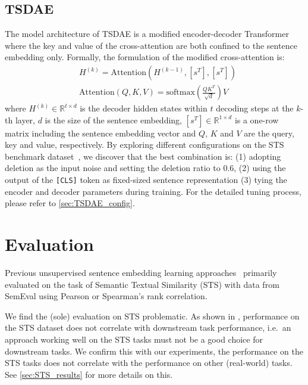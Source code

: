 \documentclass[11pt]{article}
\begin{document}
\subsection{TSDAE}

The model architecture of TSDAE is a modified encoder-decoder Transformer where the key and value of the cross-attention are both confined to the sentence embedding only. Formally, the formulation of the modified cross-attention is:
\begin{align*}
&H^{(k)} = \mathrm{Attention}(H^{(k-1)}, [s^T], [s^T]) \\
&\mathrm{Attention}(Q, K, V) = \mathrm{softmax}\left(\frac{QK^T}{\sqrt{d}}\right)V
\end{align*}
where $H^{(k)}\in \mathbb{R}^{t\times d}$ is the decoder hidden states within $t$ decoding steps at the $k$-th layer, $d$ is the size of the sentence embedding, $[s^T]\in \mathbb{R}^{1\times d}$ is a one-row matrix including the sentence embedding vector and $Q$, $K$ and $V$ are the query, key and value, respectively. 
By exploring different configurations on the  STS benchmark dataset~\citep{cer-etal-2017-semeval}, we discover that the best combination is: (1) adopting deletion as the input noise and setting the deletion ratio to 0.6, (2) using the output of the \texttt{[CLS]} token as fixed-sized sentence representation (3) tying the encoder and decoder parameters during training. For the detailed tuning process, please refer to \autoref{sec:TSDAE_config}.


\section{Evaluation} \label{sec:eval}

Previous unsupervised sentence embedding learning approaches~\citep{DBLP:journals/corr/abs-2006-03659,carlsson2021semantic,DBLP:conf/emnlp/LiZHWYL20,su2021whitening, gao2021simcse} primarily evaluated on the task of Semantic Textual Similarity (STS) with data from SemEval using Pearson or Spearman's rank correlation. 

We find the (sole) evaluation on STS problematic. As shown in \cite{DBLP:conf/coling/ReimersBG16}, performance on the STS dataset does not correlate with downstream task performance, i.e.\ an approach working well on the STS tasks must not be a good choice for downstream tasks. We confirm this with our experiments, the performance on the STS tasks does not correlate with the performance on other (real-world) tasks. See \autoref{sec:STS_results} for more details on this.
\end{document}
